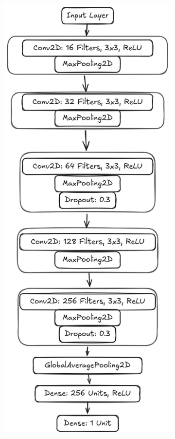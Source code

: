 \begin{figure}[H]
    \centering
    \begin{subfigure}[t]{0.45\linewidth}
        \centering
        \includegraphics[width=0.8\linewidth]{figures/tbnet2.png}

\end{subfigure}
\end{figure}
